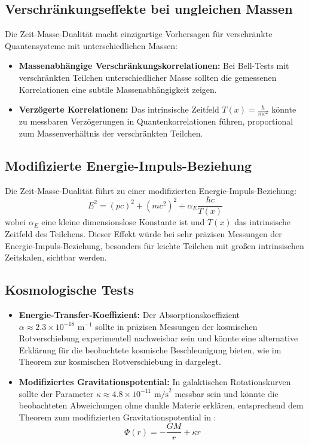 \documentclass[a4paper,12pt]{article}
\newcommand{\Tfield}{T(x)} %
\begin{document}
	\subsection{Verschränkungseffekte bei ungleichen Massen}
	
	Die Zeit-Masse-Dualität macht einzigartige Vorhersagen für verschränkte Quantensysteme mit unterschiedlichen Massen:
	
	\begin{itemize}
		\item \textbf{Massenabhängige Verschränkungskorrelationen:} Bei Bell-Tests mit verschränkten Teilchen unterschiedlicher Masse sollten die gemessenen Korrelationen eine subtile Massenabhängigkeit zeigen.
		
		\item \textbf{Verzögerte Korrelationen:} Das intrinsische Zeitfeld $\Tfield = \frac{\hbar}{mc^2}$ könnte zu messbaren Verzögerungen in Quantenkorrelationen führen, proportional zum Massenverhältnis der verschränkten Teilchen.
	\end{itemize}
	
	\subsection{Modifizierte Energie-Impuls-Beziehung}
	
	Die Zeit-Masse-Dualität führt zu einer modifizierten Energie-Impuls-Beziehung:
	\begin{equation}
		E^2 = (pc)^2 + (mc^2)^2 + \alpha_E\frac{\hbar c}{\Tfield}
	\end{equation}
	wobei $\alpha_E$ eine kleine dimensionslose Konstante ist und $\Tfield$ das intrinsische Zeitfeld des Teilchens. Dieser Effekt würde bei sehr präzisen Messungen der Energie-Impuls-Beziehung, besonders für leichte Teilchen mit großen intrinsischen Zeitskalen, sichtbar werden.
	
	\subsection{Kosmologische Tests}
	
	\begin{itemize}
		\item \textbf{Energie-Transfer-Koeffizient:} Der Absorptionskoeffizient $\alpha \approx 2.3 \times 10^{-18} \text{ m}^{-1}$ sollte in präzisen Messungen der kosmischen Rotverschiebung experimentell nachweisbar sein und könnte eine alternative Erklärung für die beobachtete kosmische Beschleunigung bieten, wie im Theorem zur kosmischen Rotverschiebung in \cite{pascher_wesentl_2025} dargelegt.
		
		\item \textbf{Modifiziertes Gravitationspotential:} In galaktischen Rotationskurven sollte der Parameter $\kappa \approx 4.8 \times 10^{-11} \text{ m/s}^2$ messbar sein und könnte die beobachteten Abweichungen ohne dunkle Materie erklären, entsprechend dem Theorem zum modifizierten Gravitationspotential in \cite{pascher_wesentl_2025}:
		\begin{equation}
			\Phi(r) = -\frac{GM}{r} + \kappa r
		\end{equation}
	\end{itemize}
	
\end{document}
